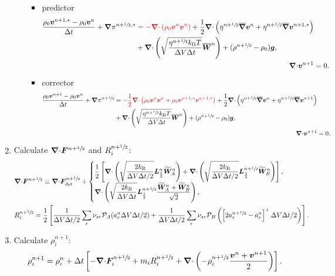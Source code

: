 \documentclass[
10pt
showpacs, showkeys,
amsmath,amssymb,
aps,
pre,
floatfix,
]{revtex4-1}
\newcommand{\divg}{{\V\nabla\cdot}}                       %
\begin{document}
\begin{enumerate}
\begin{itemize}
\begin{itemize}
\item predictor
\begin{align}
\begin{split}
\frac{\rho_0\V{v}^{n+1,*}-\rho_0\V{v}^n}{\D{t}} + \grad\pi^{n+\myhalf,*}
& = {\color{red}-\divg\left(\rho_0\V{v}^n\V{v}^n\right)}
+ \frac{1}{2}\divg\left( \eta^{n+\myhalf} \overline{\grad}\V{v}^n + \eta^{n+\myhalf} \overline{\grad}\V{v}^{n+1,*} \right) \\
& + \divg\left( \sqrt{\frac{\eta^{n+\myhalf} k_\mathrm{B}T}{\D{V}\D{t}} } \overline{\V{W}}^n \right)
+ (\rho^{n+\myhalf}-\rho_0)\V{g},
\end{split}
\\
\divg\V{v}^{n+1} & = 0.
\end{align}
\item corrector
\begin{align}
\begin{split}
\frac{\rho_0\V{v}^{n+1}-\rho_0\V{v}^n}{\D{t}} + \grad\pi^{n+\myhalf}
& = {\color{red}-\frac{1}{2}\divg\left(\rho_0\V{v}^n\V{v}^n + \rho_0\V{v}^{n+1,*}\V{v}^{n+1,*}\right)}  
+ \frac{1}{2}\divg\left( \eta^{n+\myhalf} \overline{\grad}\V{v}^n + \eta^{n+\myhalf} \overline{\grad}\V{v}^{n+1} \right) \\
&+ \divg\left( \sqrt{\frac{\eta^{n+\myhalf} k_\mathrm{B}T}{\D{V}\D{t}} } \overline{\V{W}}^n \right)
+ (\rho^{n+\myhalf}-\rho_0)\V{g},
\end{split}
\\
\divg\V{v}^{n+1} & = 0.
\end{align}
\end{itemize}

\end{itemize}


\item Calculate $\divg\V{F}^{n+\myhalf}$ and $R^{n+\sfrac{1}{2}}_i$:
\begin{align}
&\divg\V{F}^{n+\myhalf} \equiv \divg\V{F}_\mathrm{det}^{n+\myhalf} +
\begin{cases} 
\displaystyle
\frac{1}{2}\left[ 
\divg\left( \sqrt{ \frac{2k_\mathrm{B}}{\D{V}\D{t}/2} } \V{L}^n_{\frac12} \widetilde{\V{W}}^n_A \right) 
+\divg\left( \sqrt{ \frac{2k_\mathrm{B}}{\D{V}\D{t}/2} } \V{L}^{n+\myhalf}_{\frac12} \widetilde{\V{W}}^n_B \right) 
\right], \\
\displaystyle
\divg\left( \sqrt{ \frac{2k_\mathrm{B}}{\D{V}\D{t}} } \V{L}^{n+\myhalf}_{\frac12} \frac{\widetilde{\V{W}}^n_A+\widetilde{\V{W}}^n_B}{\sqrt{2}} \right),
\end{cases}
\\
&R^{n+\myhalf}_i = \frac{1}{2}\left[ \frac{1}{\D{V}\D{t}/2} \sum_r \nu_{sr} \mathcal{P}_A(a^n_r\D{V}\D{t}/2) + \frac{1}{\D{V}\D{t}/2} \sum_r \nu_{sr} \mathcal{P}_B\left( \left[ 2 a^{n+\myhalf}_r - a^n_r \right]^+ \D{V}\D{t}/2 \right) \right].
\end{align}

\item Calculate $\rho^{n+1}_i$:
\begin{equation}
\rho^{n+1}_i = \rho^n_i + \D{t} \left[ -\divg\V{F}^{n+\myhalf}_i + m_i R^{n+\myhalf}_i 
+ \divg\left( -\rho^{n+\myhalf}_i \frac{\V{v}^n + \V{v}^{n+1}}{2} \right) \right].
\end{equation} 

\end{enumerate}
\end{document}

